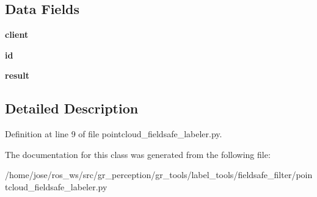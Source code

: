 \subsection*{Data Fields}
\begin{DoxyCompactItemize}
\item 
\mbox{\label{classpointcloud__fieldsafe__labeler_1_1PCFieldSafeLabeler_a8c7e67841f6ad570390525b83c68b297}} 
{\bfseries client}
\item 
\mbox{\label{classpointcloud__fieldsafe__labeler_1_1PCFieldSafeLabeler_a70a684fa313818d47a2b356cc669a910}} 
{\bfseries id}
\item 
\mbox{\label{classpointcloud__fieldsafe__labeler_1_1PCFieldSafeLabeler_a6a417b79c6a113c578b1fb3506051707}} 
{\bfseries result}
\end{DoxyCompactItemize}


\subsection{Detailed Description}


Definition at line 9 of file pointcloud\+\_\+fieldsafe\+\_\+labeler.\+py.



The documentation for this class was generated from the following file\+:\begin{DoxyCompactItemize}
\item 
/home/jose/ros\+\_\+ws/src/gr\+\_\+perception/gr\+\_\+tools/label\+\_\+tools/fieldsafe\+\_\+filter/pointcloud\+\_\+fieldsafe\+\_\+labeler.\+py\end{DoxyCompactItemize}
